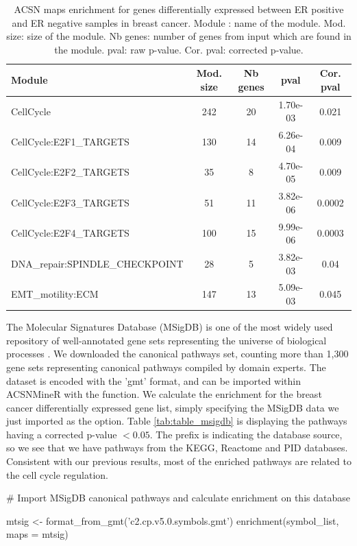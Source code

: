 \begin{table}[h!]
  \centering
  \caption{ACSN maps enrichment for genes differentially expressed between ER
positive and ER negative samples in breast cancer.  Module : name of the
module. Mod. size: size of the module. Nb genes: number of genes from input
which are found in the module. pval: raw p-value. Cor. pval: corrected p-value.}
\label{tab:table_mainz}

\begin{tabular}{l c c c c}
\toprule
Module & Mod. size & Nb genes & pval & Cor. pval\\
\midrule
CellCycle & 242 & 20 & 1.70e-03 & 0.021 \\
CellCycle:E2F1\_TARGETS & 130 & 14 & 6.26e-04 & 0.009 \\
CellCycle:E2F2\_TARGETS & 35 & 8 & 4.70e-05 & 0.009 \\
CellCycle:E2F3\_TARGETS & 51 & 11 & 3.82e-06 & 0.0002 \\
CellCycle:E2F4\_TARGETS & 100 & 15 & 9.99e-06 & 0.0003 \\
DNA\_repair:SPINDLE\_CHECKPOINT & 28 & 5 & 3.82e-03 & 0.04 \\
EMT\_motility:ECM & 147 & 13 & 5.09e-03 & 0.045 \\
\bottomrule
\end{tabular}
\end{table}

The Molecular Signatures Database (MSigDB) is one of the most widely used
repository of well-annotated  gene sets representing the universe of biological
processes \citep{liberzon2011molecular}. We downloaded the canonical pathways
set, counting more than 1,300 gene sets representing canonical pathways compiled
by domain experts. The dataset is encoded with the 'gmt' format, and can be
imported within ACSNMineR with the  function. We
calculate the enrichment for the breast cancer differentially expressed gene
list, simply specifying the MSigDB data we just imported as the 
option. Table \ref{tab:table_msigdb} is displaying the pathways having a
corrected p-value $< 0.05$. The prefix is indicating the database source, so we
see that we have pathways from the KEGG, Reactome and PID databases. Consistent
with our previous results, most of the enriched pathways are related to the cell
cycle regulation. 


\begin{example}
# Import MSigDB canonical pathways and calculate enrichment on this database 

mtsig <- format_from_gmt('c2.cp.v5.0.symbols.gmt')
enrichment(symbol_list, maps = mtsig)

\end{example}


